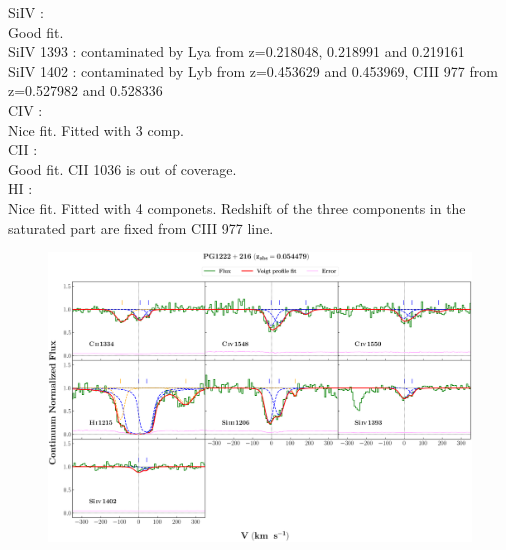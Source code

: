 \documentclass[12pt]{report}
\begin{document}
SiIV :  \\  \hspace*{1.5cm}
        Good fit.  \\
        SiIV 1393  : contaminated by Lya from z=0.218048, 0.218991 and 0.219161 \\ 
        SiIV 1402  : contaminated by Lyb from z=0.453629 and 0.453969, CIII 977 from z=0.527982 and 0.528336  \\ 

CIV :  \\  \hspace*{1.5cm}
        Nice fit. Fitted with 3 comp.  \\ 

CII :  \\  \hspace*{1.5cm}
        Good fit. CII 1036 is out of coverage.  \\ 

HI :  \\  \hspace*{1.5cm}
        Nice fit. Fitted with 4 componets. Redshift of the three components in the saturated part are fixed from CIII 977 line.  \\ 


\newpage

\begin{landscape}

\begin{figure}
    \centering
    \vspace{-20mm}
    \hspace*{-35mm}
    \includegraphics[width=1.25\linewidth]{System-Plots/PG1222+216_z=0.054479_sys_plot.png}
\end{figure}

\end{landscape}
\end{document}
